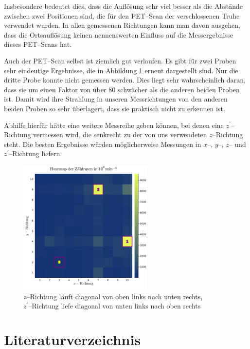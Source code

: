 \documentclass[12pt,a4paper]{scrartcl}
\numberwithin{equation}{section} %
\begin{document}
Insbesondere bedeutet dies, dass die Auflösung sehr viel besser als die Abstände zwischen zwei Positionen sind, die für den PET--Scan der verschlossenen Truhe verwendet wurden. In allen gemessenen Richtungen kann man davon ausgehen, dass die Ortsauflösung keinen nennenswerten Einfluss auf die Messergebnisse dieses PET--Scans hat.

Auch der PET--Scan selbst ist ziemlich gut verlaufen. Es gibt für zwei Proben sehr eindeutige Ergebnisse, die in Abbildung \ref{abb:heatmap} erneut dargestellt sind. Nur die dritte Probe konnte nicht gemessen werden. Dies liegt sehr wahrscheinlich daran, dass sie um einen Faktor von über $80$ schwächer als die anderen beiden Proben ist. Damit wird ihre Strahlung in unseren Messrichtungen von den anderen beiden Proben so sehr überlagert, dass sie praktisch nicht zu erkennen ist.

Abhilfe hierfür hätte eine weitere Messreihe geben können, bei denen eine $z^\prime$--Richtung vermessen wird, die senkrecht zu der von uns verwendeten $z$--Richtung steht. Die besten Ergebnisse würden möglicherweise Messungen in $x$--, $y$--, $z$-- und $z^\prime$--Richtung liefern.

\begin{figure}[h]
	\centering
	\vspace{24pt}
	\includegraphics[width=0.6\textwidth]{../media/B3.4/heatmap.jpg}
	\caption{$z$--Richtung läuft diagonal von oben links nach unten rechts, \\
		$z^\prime$--Richtung liefe diagonal von unten links nach oben rechts}
	\label{abb:heatmap}
\end{figure}

\clearpage
\hypertarget{literatur}{\section{Literaturverzeichnis}\label{literatur}}
\renewcommand{\section}[2]{}
\end{document}
